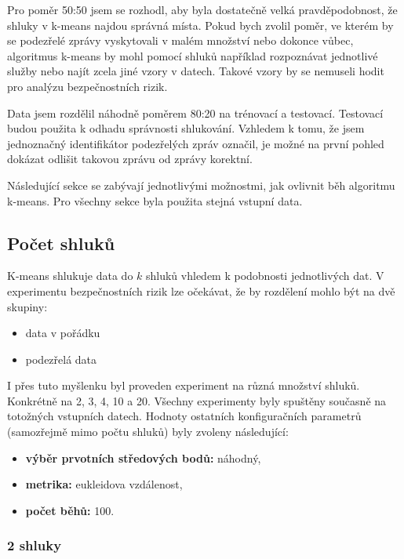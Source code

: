 \documentclass[thesis=M,czech]{FITthesis}[2012/10/20]
\begin{document}
		Pro poměr 50:50 jsem se rozhodl, aby byla dostatečně velká pravděpodobnost, že shluky v k-means najdou správná místa. Pokud bych zvolil poměr, ve kterém by se podezřelé zprávy vyskytovali v malém množství nebo dokonce vůbec, algoritmus k-means by mohl pomocí shluků například rozpoznávat jednotlivé služby nebo najít zcela jiné vzory v datech. Takové vzory by se nemuseli hodit pro analýzu bezpečnostních rizik.
		
		Data jsem rozdělil náhodně poměrem 80:20 na trénovací a testovací. Testovací budou použita k odhadu správnosti shlukování. Vzhledem k tomu, že jsem jednoznačný identifikátor podezřelých zpráv označil, je možné na první pohled dokázat odlišit takovou zprávu od zprávy korektní.
		
		Následující sekce se zabývají jednotlivými možnostmi, jak ovlivnit běh algoritmu k-means. Pro všechny sekce byla použita stejná vstupní data.

		\subsection{Počet shluků}
			K-means shlukuje data do $k$ shluků vhledem k podobnosti jednotlivých dat. V experimentu bezpečnostních rizik lze očekávat, že by rozdělení mohlo být na dvě skupiny:
			
			\begin{itemize} 
				\item data v pořádku
				\item podezřelá data		
			\end{itemize}
		
			I přes tuto myšlenku byl proveden experiment na různá množství shluků. Konkrétně na 2, 3, 4, 10 a 20. Všechny experimenty byly spuštěny současně na totožných vstupních datech. Hodnoty ostatních konfiguračních parametrů (samozřejmě mimo počtu shluků) byly zvoleny následující:
			
			\begin{itemize} 
				\item \textbf{výběr prvotních středových bodů: } náhodný,
				\item \textbf{metrika: } eukleidova vzdálenost,
				\item \textbf{počet běhů: } 100.	
			\end{itemize}
				
				\subsubsection{2 shluky}
				
\end{document}
